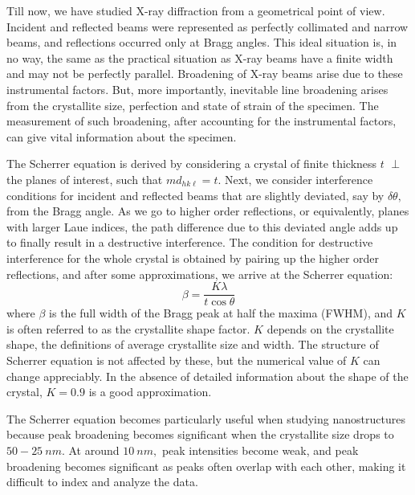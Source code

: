 	Till now, we have studied X-ray diffraction from a geometrical point of view. Incident and reflected beams were represented as perfectly collimated and narrow beams, and reflections occurred only at Bragg angles. This ideal situation is, in no way, the same as the practical situation as X-ray beams have a finite width and may not be perfectly parallel. Broadening of X-ray beams arise due to these instrumental factors. But, more importantly, inevitable line broadening arises from the crystallite size, perfection and state of strain of the specimen. The measurement of such broadening, after accounting for the instrumental factors, can give vital information about the specimen.
	
	The Scherrer equation is derived by considering a crystal of finite thickness $t$ $\perp$ the planes of interest, such that $m d_{h k \ell} = t.$ Next, we consider interference conditions for incident and reflected beams that are slightly deviated, say by $\delta \theta,$ from the Bragg angle. As we go to higher order reflections, or equivalently, planes with larger Laue indices, the path difference due to this deviated angle adds up to finally result in a destructive interference. The condition for destructive interference for the whole crystal is obtained by pairing up the higher order reflections, and after some approximations, we arrive at the Scherrer equation:%
%		
	\begin{equation}
	\beta = \dfrac{K \lambda}{t \cos \theta}
	\end{equation}%
%	
	where $\beta$ is the full width of the Bragg peak at half the maxima (FWHM), and $K$ is often referred \cite{Klug1974} to as the crystallite shape factor. $K$ depends \cite{Holzwarth2011} on the crystallite shape, the definitions of average crystallite size and width. The structure of Scherrer equation is not affected by these, but the numerical value of $K$ can change appreciably. In the absence of detailed information about the shape of the crystal, $K = 0.9$ is a good approximation.
	
	The Scherrer equation becomes particularly useful when studying nanostructures because peak broadening becomes significant \cite{AkankshaUrade2023} when the crystallite size drops to $50-25~\si{nm}.$ At around $\SI{10}{nm},$ peak intensities become weak, and peak broadening becomes significant as peaks often overlap with each other, making it difficult to index and analyze the data.